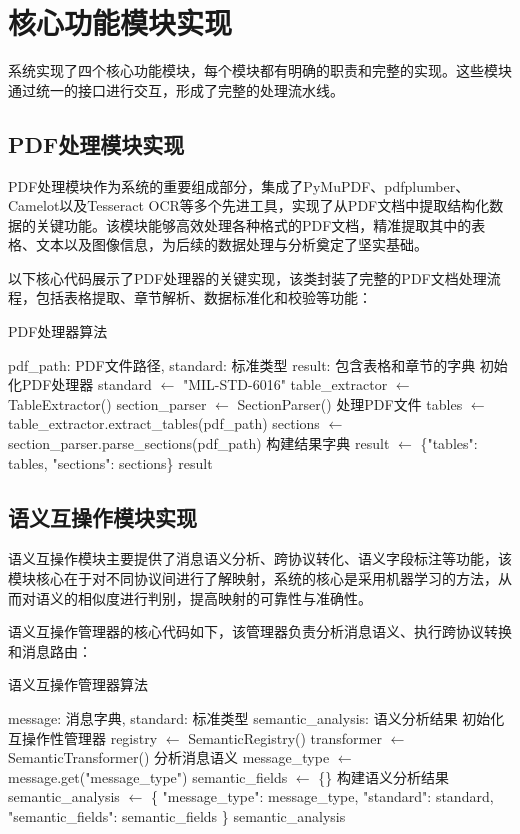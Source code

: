 \section{核心功能模块实现}

系统实现了四个核心功能模块，每个模块都有明确的职责和完整的实现。这些模块通过统一的接口进行交互，形成了完整的处理流水线。

\subsection{PDF处理模块实现}

PDF处理模块作为系统的重要组成部分，集成了PyMuPDF、pdfplumber、Camelot以及Tesseract OCR等多个先进工具，实现了从PDF文档中提取结构化数据的关键功能。该模块能够高效处理各种格式的PDF文档，精准提取其中的表格、文本以及图像信息，为后续的数据处理与分析奠定了坚实基础。

以下核心代码展示了PDF处理器的关键实现，该类封装了完整的PDF文档处理流程，包括表格提取、章节解析、数据标准化和校验等功能：

\begin{algorithm}[H]
\caption{PDF处理器算法}
\begin{algorithmic}[1]
\REQUIRE pdf\_path: PDF文件路径, standard: 标准类型
\ENSURE result: 包含表格和章节的字典
\STATE 初始化PDF处理器
\STATE standard $\leftarrow$ "MIL-STD-6016"
\STATE table\_extractor $\leftarrow$ TableExtractor()
\STATE section\_parser $\leftarrow$ SectionParser()
\STATE 处理PDF文件
\STATE tables $\leftarrow$ table\_extractor.extract\_tables(pdf\_path)
\STATE sections $\leftarrow$ section\_parser.parse\_sections(pdf\_path)
\STATE 构建结果字典
\STATE result $\leftarrow$ \{"tables": tables, "sections": sections\}
\RETURN result
\end{algorithmic}
\end{algorithm}

\subsection{语义互操作模块实现}

语义互操作模块主要提供了消息语义分析、跨协议转化、语义字段标注等功能，该模块核心在于对不同协议间进行了解映射，系统的核心是采用机器学习的方法，从而对语义的相似度进行判别，提高映射的可靠性与准确性。

语义互操作管理器的核心代码如下，该管理器负责分析消息语义、执行跨协议转换和消息路由：

\begin{algorithm}[H]
\caption{语义互操作管理器算法}
\begin{algorithmic}[1]
\REQUIRE message: 消息字典, standard: 标准类型
\ENSURE semantic\_analysis: 语义分析结果
\STATE 初始化互操作性管理器
\STATE registry $\leftarrow$ SemanticRegistry()
\STATE transformer $\leftarrow$ SemanticTransformer()
\STATE 分析消息语义
\STATE message\_type $\leftarrow$ message.get("message\_type")
\STATE semantic\_fields $\leftarrow$ \{\}
\STATE 构建语义分析结果
\STATE semantic\_analysis $\leftarrow$ \{
\STATE     "message\_type": message\_type,
\STATE     "standard": standard,
\STATE     "semantic\_fields": semantic\_fields
\STATE \}
\RETURN semantic\_analysis
\end{algorithmic}
\end{algorithm}

